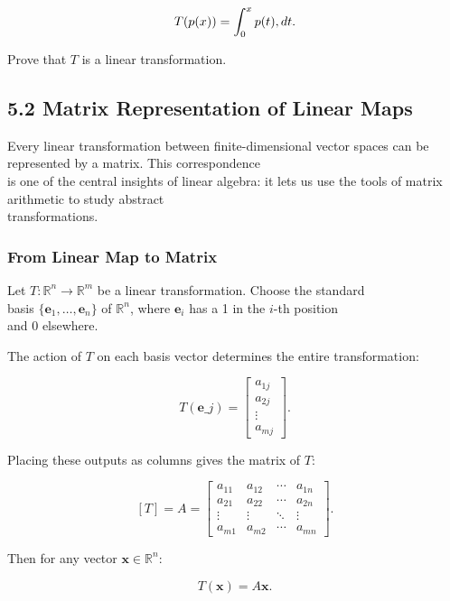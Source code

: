 \documentclass[
  12pt,
  a4paper,
]{article}
\begin{document}
\[T(p(x)) = \int_0^x p(t)\\,dt.\]

Prove that \(T\) is a linear transformation.

\subsection{5.2 Matrix Representation of Linear
Maps}\label{52-matrix-representation-of-linear-maps}

Every linear transformation between finite-dimensional vector spaces can
be represented by a matrix. This correspondence\\
is one of the central insights of linear algebra: it lets us use the
tools of matrix arithmetic to study abstract\\
transformations.

\subsubsection{From Linear Map to
Matrix}\label{from-linear-map-to-matrix}

Let \(T: \mathbb{R}^n \to \mathbb{R}^m\) be a linear transformation.
Choose the standard\\
basis \(\{ \mathbf{e}_1, \dots, \mathbf{e}_n \}\) of \(\mathbb{R}^n\),
where \(\mathbf{e}_i\) has a 1 in the \(i\)-th position\\
and 0 elsewhere.

The action of \(T\) on each basis vector determines the entire
transformation:

\[T(\mathbf{e}\_j) = \begin{bmatrix}
a_{1j} \\
a_{2j} \\
\vdots \\
a_{mj} \end{bmatrix}.\]

Placing these outputs as columns gives the matrix of \(T\):

\[[T] = A = \begin{bmatrix}
a_{11} & a_{12} & \cdots & a_{1n} \\
a_{21} & a_{22} & \cdots & a_{2n} \\
\vdots & \vdots & \ddots & \vdots \\
a_{m1} & a_{m2} & \cdots & a_{mn}
\end{bmatrix}.\]

Then for any vector \(\mathbf{x} \in \mathbb{R}^n\):

\[T(\mathbf{x}) = A\mathbf{x}.\]
\end{document}

